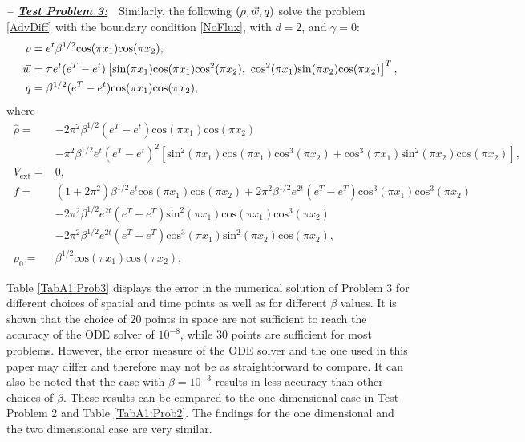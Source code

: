 \textbf{\emph{-- \underline{Test Problem 3:}}}~~Similarly, the following $(\rho,\vec{w},q)$ solve the problem \eqref{AdvDiff} with the boundary condition \eqref{NoFlux}, with $d=2$, and $\gamma =0$:
\begin{align*}
\ \rho={}&e^{t}\beta^{1/2}\text{cos}(\pi{}x_1)\text{cos}(\pi{}x_2), \\
\ \vec{w}={}&\pi e^{t}(e^{T}-e^{t})\left[\text{sin}(\pi{}x_1)\text{cos}(\pi{}x_1)\text{cos}^2(\pi{}x_2),~\text{cos}^2(\pi{}x_1)\text{sin}(\pi{}x_2)\text{cos}(\pi{}x_2)\right]^T, \\
\ \adj={}&\beta^{1/2}(e^{T}-e^{t})\text{cos}(\pi{}x_1)\text{cos}(\pi{}x_2),
\end{align*}
where
\begin{align*}
\ \widehat{\rho}={}&-2\pi^2{}\beta^{1/2}(e^{T}-e^{t})\text{cos}(\pi{}x_1)\text{cos}(\pi{}x_2) \\
\ &-\pi^2\beta^{1/2}e^{t}(e^{T}-e^{t})^2\left[\text{sin}^2(\pi{}x_1)\text{cos}(\pi{}x_1)\text{cos}^3(\pi{}x_2)+\text{cos}^3(\pi{}x_1)\text{sin}^2(\pi{}x_2)\text{cos}(\pi{}x_2)\right], \\
\ V_{\text{ext}}={}&0, \\
\ f={}&(1+2\pi^2)\beta^{1/2}e^{t}\text{cos}(\pi{}x_1)\text{cos}(\pi{}x_2)+ 2\pi^2 \beta^{1/2}e^{2t}(e^{T}-e^{T})\text{cos}^3(\pi{}x_1)\text{cos}^3(\pi{}x_2) \\
\ &-2\pi^2 \beta^{1/2}e^{2t}(e^{T}-e^{T})\text{sin}^2(\pi{}x_1)\text{cos}(\pi{}x_1)\text{cos}^3(\pi{}x_2) \\
\ &-2\pi^2 \beta^{1/2}e^{2t}(e^{T}-e^{T})\text{cos}^3(\pi{}x_1)\text{sin}^2(\pi{}x_2)\text{cos}(\pi{}x_2), \\
\ \rho_{0}={}&\beta^{1/2}\text{cos}(\pi{}x_1)\text{cos}(\pi{}x_2),
\end{align*}


Table \ref{TabA1:Prob3} displays the error in the numerical solution of Problem 3 for different choices of spatial and time points as well as for different $\beta$ values. It is shown that the choice of $20$ points in space are not sufficient to reach the accuracy of the ODE solver of $10^{-8}$, while $30$ points are sufficient for most problems. However, the error measure of the ODE solver and the one used in this paper may differ and therefore may not be as straightforward to compare. It can also be noted that the case with $\beta = 10^{-3}$ results in less accuracy than other choices of $\beta$. These results can be compared to the one dimensional case in Test Problem 2 and Table \ref{TabA1:Prob2}. The findings for the one dimensional and the two dimensional case are very similar.


